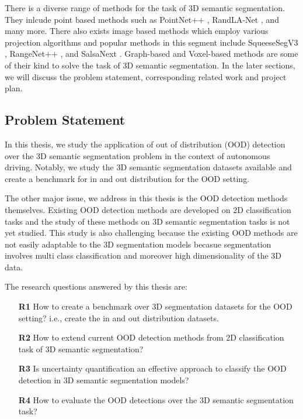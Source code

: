 \documentclass[thesis]{mas_proposal}
\begin{document}
There is a diverse range of methods for the task of 3D semantic segmentation. 
They inlcude point based methods such as PointNet++ \cite{qi2017pointnet++}, RandLA-Net \cite{Hu_2020_CVPR_Randla}, and many more.
There also exists image based methods which employ various projection algorithms and popular methods in this segment include SqueeseSegV3 \cite{Sequesesegv3_2018}, RangeNet++ \cite{Milioto2019}, and SalsaNext \cite{SalsaNext_2020}.
Graph-based and Voxel-based methods are some of their kind to solve the task of 3D semantic segmentation.
In the later sections, we will discuss the problem statement, corresponding related work and project plan.


\subsection{Problem Statement}
In this thesis, we study the application of out of distribution (OOD) detection over the 3D semantic segmentation problem in the context of autonomous driving.
Notably, we study the 3D semantic segmentation datasets available and create a benchmark for in and out distribution for the OOD setting.

The other major issue, we address in this thesis is the OOD detection methods themselves.
Existing OOD detection methods are developed on 2D classification tasks and the study of these methods on 3D semantic segmentation tasks is not yet studied. 
This study is also challenging because the existing OOD methods are not easily adaptable to the 3D segmentation models becasue segmentation involves multi class classification and moreover high dimensionality of the 3D data.
\newline

The research questions answered by this thesis are:
\begin{itemize}
    \item[\textbf{R1}] How to create a benchmark over 3D segmentation datasets for the OOD setting? i.e., create the in and out distribution datasets.
    \item[\textbf{R2}] How to extend current OOD detection methods from 2D classification task of 3D semantic segmentation?
    \item[\textbf{R3}] Is uncertainty quantification an effective approach to classify the OOD detection in 3D semantic segmentation models?
    \item[\textbf{R4}] How to evaluate the OOD detections over the 3D semantic segmentation task?
\end{itemize}
\end{document}
